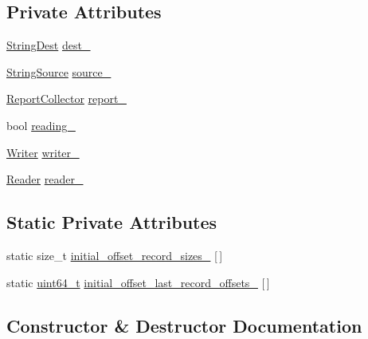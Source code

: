 \subsection*{Private Attributes}
\begin{DoxyCompactItemize}
\item 
\hyperlink{classleveldb_1_1log_1_1_log_test_1_1_string_dest}{String\+Dest} \hyperlink{classleveldb_1_1log_1_1_log_test_a411c42600e9ef78eb22577dcce8ffb70}{dest\+\_\+}
\item 
\hyperlink{classleveldb_1_1log_1_1_log_test_1_1_string_source}{String\+Source} \hyperlink{classleveldb_1_1log_1_1_log_test_a6b1751fd9e549d4bce02afbeca392058}{source\+\_\+}
\item 
\hyperlink{classleveldb_1_1log_1_1_log_test_1_1_report_collector}{Report\+Collector} \hyperlink{classleveldb_1_1log_1_1_log_test_a39e97d85a7494c9b8056c10e1124e374}{report\+\_\+}
\item 
bool \hyperlink{classleveldb_1_1log_1_1_log_test_a9aa3611d063dee048f778dd10aab37ba}{reading\+\_\+}
\item 
\hyperlink{classleveldb_1_1log_1_1_writer}{Writer} \hyperlink{classleveldb_1_1log_1_1_log_test_a8b219478ee3bf6a34802c4ebca6fae6d}{writer\+\_\+}
\item 
\hyperlink{classleveldb_1_1log_1_1_reader}{Reader} \hyperlink{classleveldb_1_1log_1_1_log_test_a7011f0308081ffe914c3b131948f06f5}{reader\+\_\+}
\end{DoxyCompactItemize}
\subsection*{Static Private Attributes}
\begin{DoxyCompactItemize}
\item 
static size\+\_\+t \hyperlink{classleveldb_1_1log_1_1_log_test_a1c32fd131248b038f38d320558a6c211}{initial\+\_\+offset\+\_\+record\+\_\+sizes\+\_\+} \mbox{[}$\,$\mbox{]}
\item 
static \hyperlink{stdint_8h_aaa5d1cd013383c889537491c3cfd9aad}{uint64\+\_\+t} \hyperlink{classleveldb_1_1log_1_1_log_test_a291ccfe6639347ff67b6039974151b0d}{initial\+\_\+offset\+\_\+last\+\_\+record\+\_\+offsets\+\_\+} \mbox{[}$\,$\mbox{]}
\end{DoxyCompactItemize}


\subsection{Constructor \& Destructor Documentation}
\hypertarget{classleveldb_1_1log_1_1_log_test_a71c5f0a5a098ca82a72e7065141a1d06}{}
